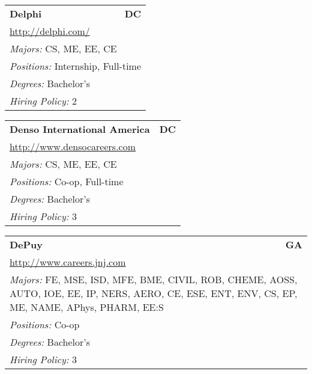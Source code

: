 \documentclass[twoside]{article}
\begin{document}
\begin{center}
\begin{multicols}{3}
\begin{FlushLeft}
\begin{minipage}{\columnwidth}
\end{minipage}
 
\begin{minipage}{\columnwidth}\begin{tabularx}{.95\columnwidth}{Xr}
                 {\Large\bf Delphi} & {\Large\bf DC}\\
    \multicolumn{2}{p{.95\columnwidth}}{\url{http://delphi.com/}}\\
    \multicolumn{2}{p{.95\columnwidth}}{\emph{Majors:} CS, ME, EE, CE}\\
    \multicolumn{2}{p{.95\columnwidth}}{\emph{Positions:} Internship, Full-time}\\
    \multicolumn{2}{p{.95\columnwidth}}{\emph{Degrees:} Bachelor's}\\
    \multicolumn{2}{p{.95\columnwidth}}{\emph{Hiring Policy:} 2}\\
    \end{tabularx}
    
\end{minipage}
 
\begin{minipage}{\columnwidth}\begin{tabularx}{.95\columnwidth}{Xr}
                 {\Large\bf Denso International America} & {\Large\bf DC}\\
    \multicolumn{2}{p{.95\columnwidth}}{\url{http://www.densocareers.com}}\\
    \multicolumn{2}{p{.95\columnwidth}}{\emph{Majors:} CS, ME, EE, CE}\\
    \multicolumn{2}{p{.95\columnwidth}}{\emph{Positions:} Co-op, Full-time}\\
    \multicolumn{2}{p{.95\columnwidth}}{\emph{Degrees:} Bachelor's}\\
    \multicolumn{2}{p{.95\columnwidth}}{\emph{Hiring Policy:} 3}\\
    \end{tabularx}
    
\end{minipage}
 
\begin{minipage}{\columnwidth}\begin{tabularx}{.95\columnwidth}{Xr}
                 {\Large\bf DePuy} & {\Large\bf GA}\\
    \multicolumn{2}{p{.95\columnwidth}}{\url{http://www.careers.jnj.com}}\\
    \multicolumn{2}{p{.95\columnwidth}}{\emph{Majors:} FE, MSE, ISD, MFE, BME, CIVIL, ROB, CHEME, AOSS, AUTO, IOE, EE, IP, NERS, AERO, CE, ESE, ENT, ENV, CS, EP, ME, NAME, APhys, PHARM, EE:S}\\
    \multicolumn{2}{p{.95\columnwidth}}{\emph{Positions:} Co-op}\\
    \multicolumn{2}{p{.95\columnwidth}}{\emph{Degrees:} Bachelor's}\\
    \multicolumn{2}{p{.95\columnwidth}}{\emph{Hiring Policy:} 3}\\
    \end{tabularx}
    

\end{minipage}
\end{FlushLeft}
\end{multicols}
\end{center}
\end{document}

